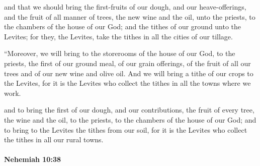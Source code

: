 			\begin{versebox}
					\item[BHS] 
					\item[LXX] 
					\item[ASV] and that we should bring the first-fruits of our dough, and our heave-offerings, and the fruit of all manner of trees, the new wine and the oil, unto the priests, to the chambers of the house of our God; and the tithes of our ground unto the Levites; for they, the Levites, take the tithes in all the cities of our tillage.
					\item[NIV] “Moreover, we will bring to the storerooms of the house of our God, to the priests, the first of our ground meal, of our grain offerings, of the fruit of all our trees and of our new wine and olive oil. And we will bring a tithe of our crops to the Levites, for it is the Levites who collect the tithes in all the towns where we work.
					\item[NRSV] and to bring the first of our dough, and our contributions, the fruit of every tree, the wine and the oil, to the priests, to the chambers of the house of our God; and to bring to the Levites the tithes from our soil, for it is the Levites who collect the tithes in all our rural towns.
			\end{versebox}

		\paragraph{Nehemiah 10:38} %
			\label{NEHEMIAH-10-38}

